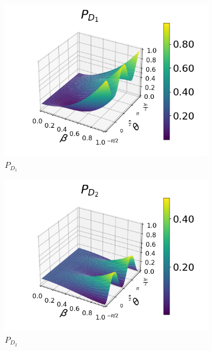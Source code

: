 \documentclass[12pt]{book}
\begin{document}
\begin{figure}[t!]
\centering
\begin{subfigure}[b]{0.3\linewidth}
\includegraphics[width=\linewidth]{images/pd1_3_pi4.png}
\caption{$P_{D_{1}}$}
\end{subfigure}
\begin{subfigure}[b]{0.3\linewidth}
\includegraphics[width=\linewidth]{images/pd2_3_pi4.png}
\caption{$P_{D_{2}}$ }
\label{fig:BS1}
\end{subfigure}
\begin{subfigure}[b]{0.3\linewidth}

\end{subfigure}
\end{figure}
\end{document}
